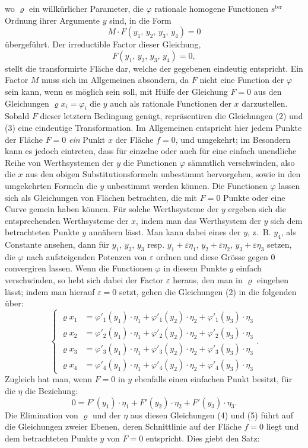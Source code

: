 \documentclass{article}
\begin{document}
wo $\varrho$ ein willkürlicher Parameter, die $\varphi$ rationale homogene Functionen $s^{\text{ter}}$ Ordnung ihrer Argumente $y$ sind, in die Form
\[
M \cdot F(y_1,\, y_2,\, y_3,\, y_4) = 0
\]
übergeführt. Der irreductible Factor dieser Gleichung,
\[
F(y_1,\, y_2,\, y_3,\, y_4) = 0, \tag{3}
\]
stellt die transformirte Fläche dar, welche der gegebenen eindeutig entspricht. Ein Factor $M$ muss sich im Allgemeinen absondern, da $F$ nicht eine Function der $\varphi$ sein kann, wenn es möglich sein soll, mit Hülfe der Gleichung $F = 0$ aus den Gleichungen $\varrho x_i = \varphi_i$ die $y$ auch als rationale Functionen der $x$ darzustellen. Sobald $F$ dieser letztern Bedingung genügt, repräsentiren die Gleichungen (2) und (3) eine eindeutige Transformation. Im Allgemeinen entspricht hier jedem Punkte der Fläche $F = 0$ \emph{ein} Punkt $x$ der Fläche $f = 0$, und umgekehrt; im Besondern kann es jedoch eintreten, dass für einzelne oder auch für eine einfach unendliche Reihe von Werthsystemen der $y$ die Functionen $\varphi$ sämmtlich verschwinden, also die $x$ aus den obigen Substitutionsformeln unbestimmt hervorgehen, sowie in den umgekehrten Formeln die $y$ unbestimmt werden können. Die Functionen $\varphi$ lassen sich als Gleichungen von Flächen betrachten, die mit $F = 0$ Punkte oder eine Curve gemein haben können. Für solche Werthsysteme der $y$ ergeben sich die entsprechenden Werthsysteme der $x$, indem man das Werthsystem der $y$ sich dem betrachteten Punkte $y$ annähern lässt. Man kann dabei eines der $y$, z.~B. $y_4$, als Constante ansehen, dann für $y_1$, $y_2$, $y_3$ resp. $y_1 + \varepsilon \eta_1$, $y_2 + \varepsilon \eta_2$, $y_3 + \varepsilon \eta_3$ setzen, die $\varphi$ nach aufsteigenden Potenzen von $\varepsilon$ ordnen und diese Grösse gegen $0$ convergiren lassen. Wenn die Functionen $\varphi$ in diesem Punkte $y$ einfach verschwinden, so hebt sich dabei der Factor $\varepsilon$ heraus, den man in $\varrho$ eingehen lässt; indem man hierauf $\varepsilon = 0$ setzt, gehen die Gleichungen (2) in die folgenden über:
\[
\left\{
\begin{aligned}
\varrho x_1 &= \varphi'_1 (y_1) \cdot \eta_1 + \varphi'_1 (y_2) \cdot \eta_2 + \varphi'_1 (y_3) \cdot \eta_3 \\
\varrho x_2 &= \varphi'_2 (y_1) \cdot \eta_1 + \varphi'_2 (y_2) \cdot \eta_2 + \varphi'_2 (y_3) \cdot \eta_3 \\
\varrho x_3 &= \varphi'_3 (y_1) \cdot \eta_1 + \varphi'_3 (y_2) \cdot \eta_2 + \varphi'_3 (y_3) \cdot \eta_3 \\
\varrho x_4 &= \varphi'_4 (y_1) \cdot \eta_1 + \varphi'_4 (y_2) \cdot \eta_2 + \varphi'_4 (y_3) \cdot \eta_3
\end{aligned}
\right. . \tag{4}
\]
Zugleich hat man, wenn $F = 0$ in $y$ ebenfalls einen einfachen Punkt besitzt, für die $\eta$ die Beziehung:
\[
0 = F'(y_1) \cdot \eta_1 + F'(y_2) \cdot \eta_2 + F'(y_3) \cdot \eta_3 . \tag{5}
\]
Die Elimination von $\varrho$ und der $\eta$ aus diesen Gleichungen (4) und (5) führt auf die Gleichungen zweier Ebenen, deren Schnittlinie auf der Fläche $f = 0$ liegt und dem betrachteten Punkte $y$ von $F = 0$ entspricht. Dies giebt den Satz:
\end{document}
